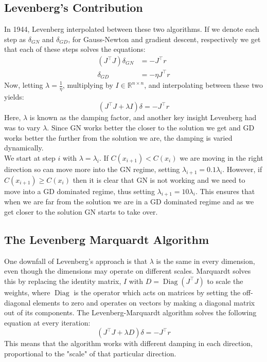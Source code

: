 \subsection{Levenberg's Contribution}\label{sec:background-lm}
In 1944, Levenberg \cite{levenberg1944} interpolated between these two algorithms. If we denote each step as $\delta_{GN}$ and $\delta_{GD}$, for Gauss-Newton and gradient descent, respectively we get that each of these steps solves the equations:
\begin{align}
  (J^\top J) \delta_{GN} &= - J^\top r \\
  \delta_{GD} &= -\eta J^\top r
\end{align}
Now, letting $\lambda = \frac{1}{\eta}$, multiplying by $I \in \mathbb{R}^{n \times n}$, and interpolating between these two yields:
\begin{equation}
  \label{eq:levenberg}
  \left(J^\top J + \lambda I \right)\delta = -J^\top r
\end{equation}
Here, $\lambda$ is known as the damping factor, and another key insight Levenberg had was to vary $\lambda$. Since GN works better the closer to the solution we get and GD works better the further from the solution we are, the damping is varied dynamically.\\
We start at step $i$ with $\lambda = \lambda_i$. If $C(x_{i+1}) < C(x_i)$ we are moving in the right direction so can move more into the GN regime, setting $\lambda_{i+1} = 0.1\lambda_i$. However, if $C(x_{i+1}) \geq C(x_{i})$ then it is clear that GN is not working and we need to move into a GD dominated regime, thus setting $\lambda_{i+1} = 10\lambda_{i}$. This ensures that when we are far from the solution we are in a GD dominated regime and as we get closer to the solution GN starts to take over.

\subsection{The Levenberg Marquardt Algorithm} 
One downfall of Levenberg's approach is that $\lambda$ is the same in every dimension, even though the dimensions may operate on different scales. Marquardt \cite{marquardt1963} solves this by replacing the identity matrix, $I$ with  $D = \operatorname{Diag}\left(J^\top J\right)$ to scale the weights, where $\operatorname{Diag}$ is the operator which acts on matrices by setting the off-diagonal elements to zero and operates on vectors by making a diagonal matrix out of its components. The Levenberg-Marquardt algorithm solves the following equation at every iteration:
\begin{equation}
  \label{eq:lm}
  \left(J^{\top}J + \lambda D \right)\delta = -J^{\top} r 
\end{equation}
This means that the algorithm works with different damping in each direction, proportional to the "scale" of that particular direction.

